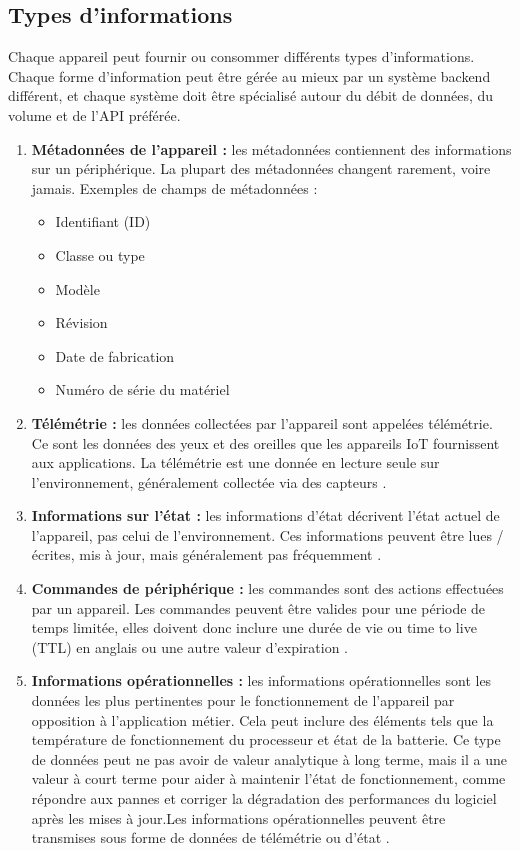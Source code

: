 \subsection{Types d'informations}Chaque appareil peut fournir ou consommer différents types d'informations. Chaque forme d'information peut être gérée au mieux par un système backend différent, et chaque système doit être spécialisé autour du débit de données, du volume et de l'API préférée.
\begin{enumerate}
       \item \textbf{Métadonnées de l'appareil :} les métadonnées contiennent des informations sur un périphérique. La plupart des métadonnées changent rarement, voire jamais. Exemples de champs de métadonnées  \cite{apthorpe2017smart}:
    \begin{itemize}
        \item Identifiant (ID)
        \item Classe ou type
        \item Modèle
        \item Révision
        \item Date de fabrication
        \item Numéro de série du matériel
    \end{itemize}
    \item \textbf{Télémétrie :} les données collectées par l'appareil sont appelées télémétrie. Ce sont les données des yeux et des oreilles que les appareils IoT fournissent aux applications. La télémétrie est une donnée en lecture seule sur l'environnement, généralement collectée via des capteurs \cite{satija2017real}.
    \item \textbf{Informations sur l'état :} les informations d'état décrivent l'état actuel de l'appareil, pas celui de l'environnement. Ces informations peuvent être lues / écrites, mis à jour, mais généralement pas fréquemment \cite{kim2015iot}.
    \item \textbf{Commandes de périphérique :} les commandes sont des actions effectuées par un appareil. Les commandes peuvent être valides pour une période de temps limitée, elles doivent donc inclure une durée de vie ou time to live (TTL)  en anglais ou une autre valeur d'expiration \cite{kim2015iot}.
    \item \textbf{Informations opérationnelles :} les informations opérationnelles sont les données les plus pertinentes pour le fonctionnement de l'appareil par opposition à l'application métier. Cela peut inclure des éléments tels que la température de fonctionnement du processeur et état de la batterie. Ce type de données peut ne pas avoir de valeur analytique à long terme, mais il a une valeur à court terme pour aider à maintenir l'état de fonctionnement, comme répondre aux pannes et corriger la dégradation des performances du logiciel après les mises à jour.Les informations opérationnelles peuvent être transmises sous forme de données de télémétrie ou d'état \cite{tang2019review}.

\end{enumerate}
